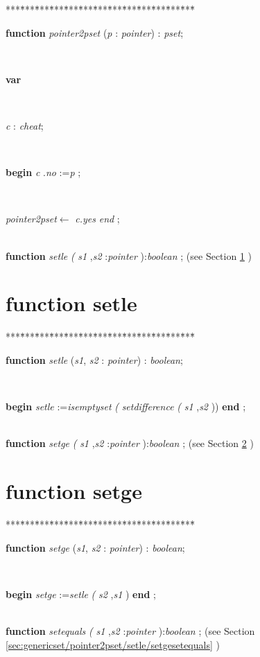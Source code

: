 \documentclass[10pt, a4paper]{article}
\begin{document}
\begin{tabbing}
***\=***\=***\=***\=***\=***\=***\=***\=***\=***\=***\=***\=***\=\kill
\parbox{14cm}{\textsf {\textbf {function } \textsf{\textit{pointer2pset} (\textit{p} : \textit{pointer}) : \textit{pset}}; }}\\
\+\parbox{14cm}{\textsf{\textbf{var} }}\\
\parbox{14cm}{\textsf{\textit{c} : \textit{cheat}}; }\\
\-\<\+\parbox{14cm}{\textsf{\textbf{begin}  \textit{c} .\textit{no} :=\textit{p} ;}}\\
\<\-\parbox{14cm}{\textsf{\textit{pointer2pset}$\leftarrow$ \textit{c.yes}  \textit{end} }; }\\
\+\textsf{\textbf{function}  \textit{setle} \textit{(} \textit{s1} ,\textit{s2} :\textit{pointer} ):\textit{boolean} ;} (see Section \ref{sec:genericset/pointer2psetsetle} )\\
\end{tabbing}
\section{function setle}\label{sec:genericset/pointer2psetsetle}

\begin{tabbing}
***\=***\=***\=***\=***\=***\=***\=***\=***\=***\=***\=***\=***\=\kill
\parbox{14cm}{\textsf {\textbf {function } \textsf{\textit{setle} (\textit{s1}, \textit{s2} : \textit{pointer}) : \textit{boolean}}; }}\\
\parbox{14cm}{\textsf{\textbf{begin}  \textit{setle} :=\textit{isemptyset} \textit{(} \textit{setdifference} \textit{(} \textit{s1} ,\textit{s2} )) \textbf{end} ;}}\\
\+\textsf{\textbf{function}  \textit{setge} \textit{(} \textit{s1} ,\textit{s2} :\textit{pointer} ):\textit{boolean} ;} (see Section \ref{sec:genericset/pointer2pset/setlesetge} )\\
\end{tabbing}
\section{function setge}\label{sec:genericset/pointer2pset/setlesetge}

\begin{tabbing}
***\=***\=***\=***\=***\=***\=***\=***\=***\=***\=***\=***\=***\=\kill
\parbox{14cm}{\textsf {\textbf {function } \textsf{\textit{setge} (\textit{s1}, \textit{s2} : \textit{pointer}) : \textit{boolean}}; }}\\
\parbox{14cm}{\textsf{\textbf{begin}  \textit{setge} :=\textit{setle} \textit{(} \textit{s2} ,\textit{s1} ) \textbf{end} ;}}\\
\+\textsf{\textbf{function}  \textit{setequals} \textit{(} \textit{s1} ,\textit{s2} :\textit{pointer} ):\textit{boolean} ;} (see Section \ref{sec:genericset/pointer2pset/setle/setgesetequals} )\\
\end{tabbing}
\end{document}

